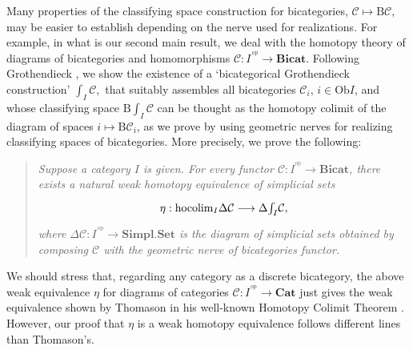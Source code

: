 \documentclass[]{amsart}
\begin{document}
Many properties of the classifying space construction for bicategories, ${\ensuremath{\mathcal{C}}}\mapsto {\ensuremath{\mathrm{B}}}{\ensuremath{\mathcal{C}}}$, may
be easier to establish depending on the nerve used for realizations. For example, in what is our
second main result, we deal with the homotopy theory of diagrams of bicategories and homomorphisms
${\ensuremath{\mathcal{C}}}:I^{^{\,\mathrm{op}}}\to {\ensuremath{\mathbf{Bicat}}}$. Following Grothendieck \cite{grothendieck}, we show the
existence of a `bicategorical Grothendieck construction' $\int_I \!{\ensuremath{\mathcal{C}}}, $
 that suitably assembles all bicategories ${\ensuremath{\mathcal{C}}}_i$, $i\in\mathrm{Ob}I$, and whose classifying  space ${\ensuremath{\mathrm{B}}}\!\int_I \!{\ensuremath{\mathcal{C}}}$ can be thought as the homotopy colimit of the diagram of spaces $i\mapsto {\ensuremath{\mathrm{B}}}{\ensuremath{\mathcal{C}}}_i$, as we prove by using geometric nerves for realizing classifying spaces of bicategories. More precisely, we prove the following:
\begin{quote}
{\em Suppose a category $I$ is given. For every functor ${\ensuremath{\mathcal{C}}}:I^{^{\mathrm{op}}}\to{\ensuremath{\mathbf{Bicat}}}$, there
exists a natural weak homotopy equivalence of simplicial sets
$$ \xymatrix{\eta: {\ensuremath{\mathrm{hocolim}}}_I{\ensuremath{\Delta}}{\ensuremath{\mathcal{C}}}\longrightarrow
{\ensuremath{\Delta}}\!\int_I\!{\ensuremath{\mathcal{C}}},}$$  where ${\ensuremath{\Delta}}{\ensuremath{\mathcal{C}}}: I^{^{\,\mathrm{op}}}\to{\ensuremath{\mathbf{Simpl.Set}}}$ is the diagram of simplicial
sets obtained by composing ${\ensuremath{\mathcal{C}}}$ with the geometric nerve of bicategories functor. }
\end{quote}

We should stress that, regarding any category as a discrete bicategory, the above weak equivalence
$\eta$  for diagrams of categories ${\ensuremath{\mathcal{C}}}:I^{^{\,\mathrm{op}}}\to {\ensuremath{\mathbf{Cat}}}$
  just gives the weak equivalence shown  by Thomason  in his well-known Homotopy Colimit Theorem \cite{thomason}.  However, our proof that $\eta$ is a weak homotopy equivalence follows different lines than Thomason's.
\end{document}
